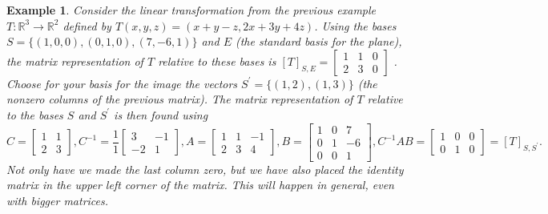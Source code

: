 \documentclass[10pt]{article}
\theoremstyle{plain}
\theoremstyle{box}
\newtheorem{example}{Example}
\begin{document}
\begin{example}
Consider the linear transformation from the previous example $T:{\mathbb{R}}^3\to {\mathbb{R}}^2$ defined by $T(x,y,z)=(x+y-z,2x+3y+4z)$. Using the bases $S=\{(1,0,0),(0,1,0),(7,-6,1)\}$ and $E$ (the standard basis for the plane), the matrix representation of $T$ relative to these bases is  
$[T]_{S,E} = \begin{bmatrix}
 1 & 1 &0\\
 2 & 3 &0
\end{bmatrix}$
. Choose for your basis for the image the vectors $S^\prime = \{(1,2),(1,3)\}$ (the nonzero columns of the previous matrix). The matrix representation of $T$ relative to the bases $S$ and $S^\prime$ is then found using 
$$C=
\begin{bmatrix}
1 & 1\\
2 & 3
\end{bmatrix},
C^{-1} = \frac{1}{1}
\begin{bmatrix}
3 & -1\\
-2 & 1
\end{bmatrix},
A=
\begin{bmatrix}
 1 & 1 & -1 \\
 2 & 3 & 4
\end{bmatrix}, 
B=
\begin{bmatrix}
 1 & 0 &7\\
 0 & 1 &-6\\
 0 & 0 &1
\end{bmatrix},
C^{-1}AB= 
\begin{bmatrix}
 1 & 0 & 0 \\
 0 & 1 & 0
\end{bmatrix} = [T]_{S,S^\prime}.$$ Not only have we made the last column zero, but we have also placed the identity matrix in the upper left corner of the matrix. This will happen in general, even with bigger matrices.


\end{example}
\end{document}
